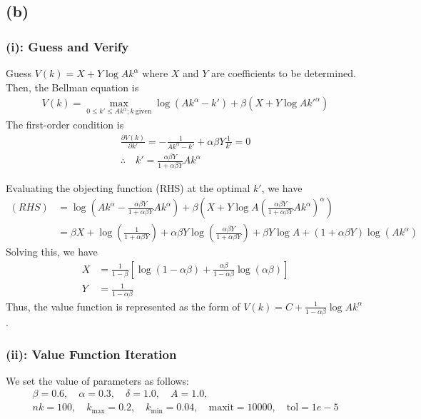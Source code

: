 \documentclass{ltjsarticle}
\begin{document}
\subsection*{(b)}
\subsubsection*{(i): Guess and Verify}
Guess $V(k) = X + Y \log A k^\alpha$ where $X$ and $Y$ are coefficients to be determined.
Then, the Bellman equation is
\begin{gather*}
    V(k) = \max_{0 \leq k' \leq  A k^\alpha; k \: \text{given}} \log (A k^\alpha - k') + \beta (X + Y \log A k'^\alpha)
\end{gather*}
The first-order condition is
\begin{gather*}
    \frac{\partial V(k)}{\partial k'} = - \frac{1}{A k^\alpha - k'} + \alpha \beta Y \frac{1}{k'} = 0\\
    \therefore \quad k' = \frac{\alpha \beta Y}{1 + \alpha \beta Y} A k^\alpha
\end{gather*}

Evaluating the objecting function (RHS) at the optimal $k'$, we have
\begin{align*}
    (RHS)
    &= \log \left( A k^\alpha - \frac{\alpha \beta Y}{1 + \alpha \beta Y} A k^\alpha \right) + \beta (X + Y \log A \left( \frac{\alpha \beta Y}{1 + \alpha \beta Y} A k^\alpha \right)^\alpha) \\
    &= \beta X + \log \left( \frac{1}{1+\alpha\beta Y}\right) + \alpha\beta Y \log \left( \frac{\alpha \beta Y}{1+\alpha \beta Y}\right) + \beta Y \log A + (1+\alpha\beta Y) \log(A k^\alpha)
\end{align*}
Solving this, we have
\begin{align*}
    X &= \frac{1}{1-\beta} \left[ \log \left( 1-\alpha\beta \right) +  \frac{\alpha \beta}{1 - \alpha \beta} \log \left( \alpha \beta \right)  \right] \\
    Y &= \frac{1}{1-\alpha\beta} 
\end{align*}
Thus, the value function is represented as the form of $V(k) = C + \frac{1}{1-\alpha\beta}\log A k^\alpha$. 

\subsubsection*{(ii): Value Function Iteration}

We set the value of parameters as follows:
\begin{gather*}
    \beta = 0.6, \quad \alpha = 0.3, \quad \delta = 1.0, \quad A = 1.0, \\ nk = 100, \quad k_{\max} = 0.2, \quad k_{\min} = 0.04, \quad \text{maxit} = 10000, \quad \text{tol} = 1e-5
\end{gather*}
\end{document}

